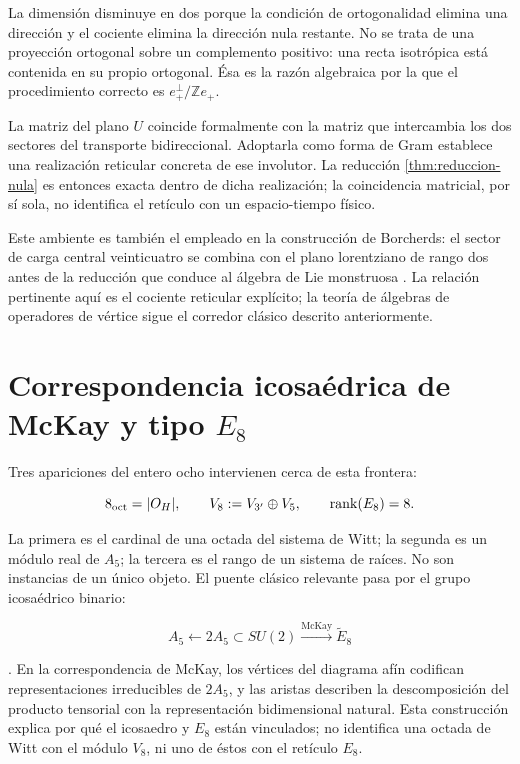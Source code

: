 La dimensión disminuye en dos porque la condición de ortogonalidad elimina
una dirección y el cociente elimina la dirección nula restante. No se trata
de una proyección ortogonal sobre un complemento positivo: una recta
isotrópica está contenida en su propio ortogonal. Ésa es la razón algebraica
por la que el procedimiento correcto es \(e_+^\perp/\mathbb Ze_+\).

La matriz del plano \(U\) coincide formalmente con la matriz que intercambia
los dos sectores del transporte bidireccional. Adoptarla como forma de Gram
establece una realización reticular concreta de ese involutor. La reducción
\cref{thm:reduccion-nula} es entonces exacta dentro de dicha realización;
la coincidencia matricial, por sí sola, no identifica el retículo con un
espacio-tiempo físico.

Este ambiente es también el empleado en la construcción de Borcherds: el
sector de carga central veinticuatro se combina con el plano lorentziano de
rango dos antes de la reducción que conduce al álgebra de Lie monstruosa
\cite{Borcherds1992}. La relación pertinente aquí es el cociente reticular
explícito; la teoría de álgebras de operadores de vértice sigue el corredor
clásico descrito anteriormente.


\section{Correspondencia icosaédrica de McKay y tipo \texorpdfstring{\(E_8\)}{E8}}
\label{sec:tres-ochos}

Tres apariciones del entero ocho intervienen cerca de esta frontera:

\[
8_{\rm oct}=|O_H|,
\qquad
V_8:=V_{3'}\oplus V_5,
\qquad
\operatorname{rank}(E_8)=8.
\]

La primera es el cardinal de una octada del sistema de Witt; la segunda es
un módulo real de \(A_5\); la tercera es el rango de un sistema de raíces. No
son instancias de un único objeto. El puente clásico relevante pasa por el
grupo icosaédrico binario:

\[
A_5\longleftarrow2A_5\subset SU(2)
\xrightarrow{\text{McKay}}\widetilde E_8
\]

\cite{McKay1980}. En la correspondencia de McKay, los vértices del diagrama
afín codifican representaciones irreducibles de \(2A_5\), y las aristas
describen la descomposición del producto tensorial con la representación
bidimensional natural. Esta construcción explica por qué el icosaedro y
\(E_8\) están vinculados; no identifica una octada de Witt con el módulo
\(V_8\), ni uno de éstos con el retículo \(E_8\).

